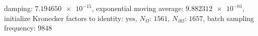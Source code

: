 damping: $\num[scientific-notation=true]{7.194650e-15}$, exponential moving average: $\num[scientific-notation=true]{9.882312e-01}$, initialize Kronecker factors to identity: $\text{yes}$, $N_{\Omega}$: $\num[scientific-notation=false]{1561}$, $N_{\partial\Omega}$: $\num[scientific-notation=false]{1657}$, batch sampling frequency: $\num[scientific-notation=false]{9848}$
